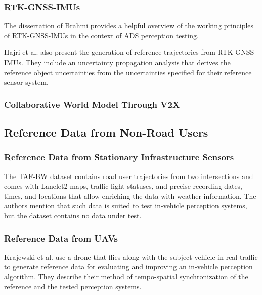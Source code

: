 \documentclass[conference]{IEEEtran}
\begin{document}
\subsubsection{RTK-GNSS-IMUs}
\label{sec:ref_data_rtk_gnss_imu}

The dissertation of Brahmi \cite{Brahmi2020diss} provides a helpful overview of the working principles of RTK-GNSS-IMUs in the context of ADS perception testing.

Hajri et al. \cite{Hajri2018groundtruth} also present the generation of reference trajectories from RTK-GNSS-IMUs. They include an uncertainty propagation analysis that derives the reference object uncertainties from the uncertainties specified for their reference sensor system. 

\subsubsection{Collaborative World Model Through V2X}
\label{sec:collaborative_world_model}

\subsection{Reference Data from Non-Road Users}
\label{sec:data_from_external}

\subsubsection{Reference Data from Stationary Infrastructure Sensors}

The TAF-BW dataset \cite{Zipfl2020tafbw} contains road user trajectories from two intersections and comes with Lanelet2 maps, traffic light statuses, and precise recording dates, times, and locations that allow enriching the data with weather information.
The authors mention that such data is suited to test in-vehicle perception systems, but the dataset contains no data under test. 


\subsubsection{Reference Data from UAVs}
\label{sec:ref_data_UAVs}

Krajewski et al. \cite{Krajewski2021drone} use a drone that flies along with the subject vehicle in real traffic to generate reference data for evaluating and improving an in-vehicle perception algorithm. 
They describe their method of tempo-spatial synchronization of the reference and the tested perception systems.
\end{document}
